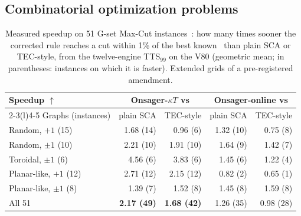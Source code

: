 \subsection{Combinatorial optimization problems}\label{subsec:gset}
\begin{table}[t]
\centering
\caption{Measured speedup on 51 G-set Max-Cut instances~\cite{helmberg2000spectral,ye_gset}: how many times sooner the corrected rule reaches a cut within 1\% of the best known~\cite{benlic2013breakout,ma2017multiple} than plain SCA or TEC-style, from the twelve-engine TTS$_{99}$ on the V80 (geometric mean; in parentheses: instances on which it is faster). Extended grids of a pre-registered amendment.}
\label{tab:gset}
\setlength{\tabcolsep}{2.5pt}
\begin{tabular}{@{}lrrrr@{}}
\toprule
Speedup $\uparrow$ & \multicolumn{2}{c}{Onsager-$\kappa T$ vs} & \multicolumn{2}{c}{Onsager-online vs} \\
\cmidrule(lr){2-3}\cmidrule(l){4-5}
Graphs (instances) & plain SCA & TEC-style & plain SCA & TEC-style \\
\midrule
Random, $+1$ (15) & 1.68 (14) & 0.96 (6) & 1.32 (10) & 0.75 (8) \\
Random, $\pm1$ (10) & 2.21 (10) & 1.91 (10) & 1.64 (9) & 1.42 (7) \\
Toroidal, $\pm1$ (6) & 4.56 (6) & 3.83 (6) & 1.45 (6) & 1.22 (4) \\
Planar-like, $+1$ (12) & 2.71 (12) & 2.15 (12) & 0.82 (2) & 0.65 (1) \\
Planar-like, $\pm1$ (8) & 1.39 (7) & 1.52 (8) & 1.45 (8) & 1.59 (8) \\
\midrule
All 51 & \textbf{2.17 (49)} & \textbf{1.68 (42)} & 1.26 (35) & 0.98 (28) \\
\bottomrule
\end{tabular}
\vspace{-0.6em}%
\end{table}
